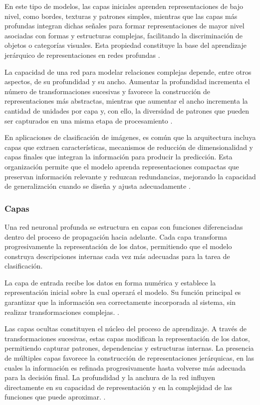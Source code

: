 En este tipo de modelos, las capas iniciales aprenden representaciones de bajo nivel, como bordes, texturas y patrones simples, mientras que las capas más profundas integran dichas señales para formar representaciones de mayor nivel asociadas con formas y estructuras complejas, facilitando la discriminación de objetos o categorías visuales. Esta propiedad constituye la base del aprendizaje jerárquico de representaciones en redes profundas \parencite{zakeri2023vision,zurowietz2020feature}.

La capacidad de una red para modelar relaciones complejas depende, entre otros aspectos, de su profundidad y su ancho. Aumentar la profundidad incrementa el número de transformaciones sucesivas y favorece la construcción de representaciones más abstractas, mientras que aumentar el ancho incrementa la cantidad de unidades por capa y, con ello, la diversidad de patrones que pueden ser capturados en una misma etapa de procesamiento  \parencite{khan2020survey}.

En aplicaciones de clasificación de imágenes, es común que la arquitectura incluya capas que extraen características, mecanismos de reducción de dimensionalidad y capas finales que integran la información para producir la predicción. Esta organización permite que el modelo aprenda representaciones compactas que preservan información relevante y reduzcan redundancias, mejorando la capacidad de generalización cuando se diseña y ajusta adecuadamente \parencite{khan2020survey,chandraprakash2024spss}.

\subsubsection{Capas}

Una red neuronal profunda se estructura en capas con funciones diferenciadas dentro del proceso de propagación hacia adelante. Cada capa transforma progresivamente la representación de los datos, permitiendo que el modelo construya descripciones internas cada vez más adecuadas para la tarea de clasificación.

La capa de entrada recibe los datos en forma numérica y establece la representación inicial sobre la cual operará el modelo. Su función principal es garantizar que la información sea correctamente incorporada al sistema, sin realizar transformaciones complejas. \parencite{joselin2024healthcare}.

Las capas ocultas constituyen el núcleo del proceso de aprendizaje. A través de transformaciones sucesivas, estas capas modifican la representación de los datos, permitiendo capturar patrones, dependencias y estructuras internas. La presencia de múltiples capas favorece la construcción de representaciones jerárquicas, en las cuales la información es refinada progresivamente hasta volverse más adecuada para la decisión final. La profundidad y la anchura de la red influyen directamente en su capacidad de representación y en la complejidad de las funciones que puede aproximar. \parencite{kamho2022complexity,apicella2024hidden}.

